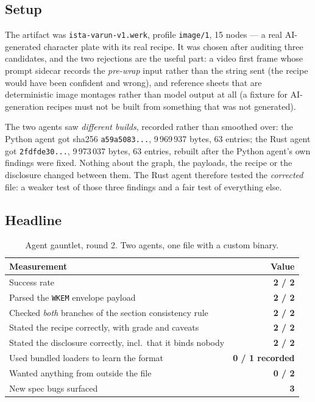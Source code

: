 \documentclass[10pt,twocolumn,letterpaper]{article}
\newcommand{\code}[1]{\texttt{\small #1}}
\begin{document}
\subsection{Setup}

The artifact was \code{ista-varun-v1.werk}, profile \code{image/1}, 15
nodes --- a real AI-generated character plate with its real recipe. It was chosen
after auditing three candidates, and the two rejections are the useful part: a
video first frame whose prompt sidecar records the \emph{pre-wrap} input rather
than the string sent (the recipe would have been confident and wrong), and
reference sheets that are deterministic image montages rather than model output at
all (a fixture for AI-generation recipes must not be built from something that was
not generated).

The two agents saw \emph{different builds}, recorded rather than smoothed over:
the Python agent got sha256 \code{a59a5083...}, 9\,969\,937 bytes, 63 entries; the
Rust agent got \code{2fdfde30...}, 9\,973\,037 bytes, 63 entries, rebuilt after the
Python agent's own findings were fixed. Nothing about the graph, the payloads, the
recipe or the disclosure changed between them. The Rust agent therefore tested the
\emph{corrected} file: a weaker test of those three findings and a fair test of
everything else.

\subsection{Headline}

\begin{table}[t]
\caption{Agent gauntlet, round 2. Two agents, one file with a custom binary.}
\label{tab:r2head}
\small
\begin{tabular}{@{}L{5.4cm}r@{}}
\toprule
Measurement & Value \\
\midrule
Success rate & \textbf{2 / 2} \\
Parsed the \code{WKEM} envelope payload & \textbf{2 / 2} \\
Checked \emph{both} branches of the section consistency rule & \textbf{2 / 2} \\
Stated the recipe correctly, with grade and caveats & \textbf{2 / 2} \\
Stated the disclosure correctly, incl.\ that it binds nobody & \textbf{2 / 2} \\
Used bundled loaders to learn the format & \textbf{0 / 1 recorded} \\
Wanted anything from outside the file & \textbf{0 / 2} \\
New spec bugs surfaced & \textbf{3} \\
\bottomrule
\end{tabular}
\end{table}
\end{document}
